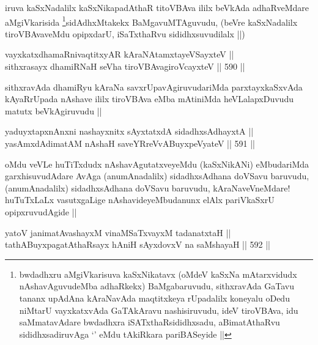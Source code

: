 \begin{artha}
iruva kaSxNadalilx kaSxNikapadAthaR titoVBAva ililx beVkAda adhaRveMdare aMgiVkarisida \footnote{bwdadhxru aMgiVkarisuva kaSxNikatavx (oMdeV kaSxNa mAtarxvidudx nAshavAguvudeMba adhaRkekx) BaMgabaruvudu, sithxravAda GaTavu tananx upAdAna kAraNavAda maqtitxkeya rUpadalilx koneyalu oDedu niMtarU vayxkatxvAda GaTAkAravu nashisiruvudu, ideV tiroVBAva, idu saMmatavAdare bwdadhxra iSATxthaRsididhxsadu, aBimatAthaRvu sididhxsadiruvAga `\stext' eMdu tAkiRkara pariBASeyide ||}sidAdhxMtakekx BaMgavuMTAguvudu, (beVre kaSxNadalilx tiroVBAvaveMdu opipxdarU, iSaTxthaRvu sididhxsuvudilalx ||)
\end{artha}


\begin{shl}
vayxkatxdhamaRnivaqtitxyAR kAraNAtamxtayeVSayxteV || \\
sithxrasayx dhamiRNaH seVha tiroVBAvagiroVcayxteV ||  590 ||  
\end{shl}

\begin{artha}
sithxravAda dhamiRyu kAraNa savxrUpavAgiruvudariMda parxtayxkaSxvAda kAyaRrUpada nAshave ililx tiroVBAva eMba mAtiniMda heVLalapxDuvudu matutx beVkAgiruvudu ||
\end{artha}


\begin{shl}
yaduyxtapxnAnxni nashayxnitx sAyxtatxdA sidadhxsAdhayxtA || \\
yasAmxdAdimatAM nAshaH saveYRreVvABuyxpeVyateV ||  591 ||  
\end{shl}

\begin{artha}
oMdu veVLe huTiTxdudx nAshavAgutatxveyeMdu (kaSxNikANi) eMbudariMda garxhisuvudAdare AvAga (anumAnadalilx) sidadhxsAdhana doVSavu baruvudu, (anumAnadalilx) sidadhxsAdhana doVSavu baruvudu, kAraNaveVneMdare! huTuTxLaLx vasutxgaLige nAshavideyeMbudanunx elAlx pariVkaSxrU opipxruvudAgide ||
\end{artha}


\begin{shl}
yatoV janimatA\s vashayxM vinaMSaTxvayxM tadanatxtaH || \\
tathA\s BuyxpagatAthaRsayx hAniH sAyxdovxV na saMshayaH ||  592 ||  
\end{shl}

